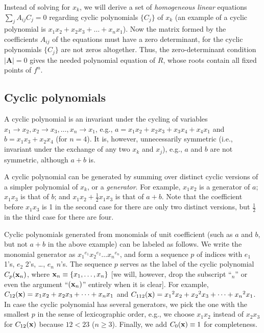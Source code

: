 \documentclass{ws-ijbc}
\begin{document}
Instead of solving  for $x_k$,
  we will derive a set of \emph{homogeneous linear} equations
  $\sum_j A_{ij} C_j = 0$
  regarding cyclic polynomials $\{C_j\}$ of $x_k$
  (an example of a cyclic polynomial is $x_1 x_2 + x_2 x_3 + \dots + x_n x_1$).
%
Now the matrix formed by the coefficients $A_{ij}$ of the equations
  must have a zero determinant,
  for the cyclic polynomials $\{C_j\}$ are not zeros altogether.
%
Thus, the zero-determinant condition $|\mathbf A| = 0$ gives
  the needed polynomial equation of $R$,
whose roots contain all fixed points of $f^n$.
%


\subsection{\label{sec:cyclic}Cyclic polynomials}


A cyclic polynomial is an invariant
  under the cycling of variables
  $x_1 \rightarrow x_2, x_2 \rightarrow x_3,
  \ldots, x_n \rightarrow x_1$,
  e.g., $a = x_1 x_2 + x_2 x_3 + x_3 x_4 + x_4 x_1$
  and $b = x_1 x_3 + x_2 x_4$ (for $n = 4$).
%
It is, however, unnecessarily symmetric
  (i.e., invariant under the exchange of any two $x_k$ and $x_{j}$),
  e.g., $a$ and $b$ are not symmetric,
  although $a + b$ is.


A cyclic polynomial can be generated by summing over
  distinct cyclic versions of a simpler polynomial of $x_k$, or a \emph{generator}.
For example,
$x_1 x_2$ is a generator of $a$;
$x_1 x_3$ is that of $b$;
and
$x_1 x_2 + \frac{1}{2} x_1 x_3$ is that of $a + b$.
Note that the coefficient before $x_1 x_3$
  is 1 in the second case
  for there are only two distinct versions,
  but $\frac{1}{2}$ in the third case
  for there are four. %



Cyclic polynomials
  generated from monomials of unit coefficient
  (such as $a$ and $b$, but not $a + b$ in the above example)
  can be labeled as follows.
We write the monomial generator as
  ${x_1}^{e_1} {x_2}^{e_2} \dots {x_n}^{e_n}$,
  and form a sequence $p$ of indices with
  $e_1$ 1's, $e_2$ 2's, \ldots, $e_n$ $n$'s.
The sequence $p$ serves as the label of the cyclic polynomial $C_p(\mathbf{x}_{n})$,
  where $\mathbf{x}_{n} \equiv \{x_1, \ldots, x_n\}$
[we will, however, drop the subscript ``$_n$'' or
  even the argument ``$(\mathbf{x}_{n})$'' entirely when it is clear].
For example,
  $C_{12}(\mathbf{x})  = x_1 x_2 + x_2 x_3 + \dots + x_n x_1$ and
  $C_{112}(\mathbf{x}) = {x_1}^2 x_2 + {x_2}^2 x_3 + \dots + {x_n}^2 x_1$.
In case the cyclic polynomial has several generators,
  we pick the one with the smallest $p$
  in the sense of lexicographic order,
  e.g., we choose $x_1 x_2$ instead of $x_2 x_3$ for $C_{12}(\mathbf{x})$
  because $12 < 23$ ($n \ge 3$).
Finally, we add $C_0(\mathbf{x}) \equiv 1$ for completeness.
%
%
%
\end{document}
